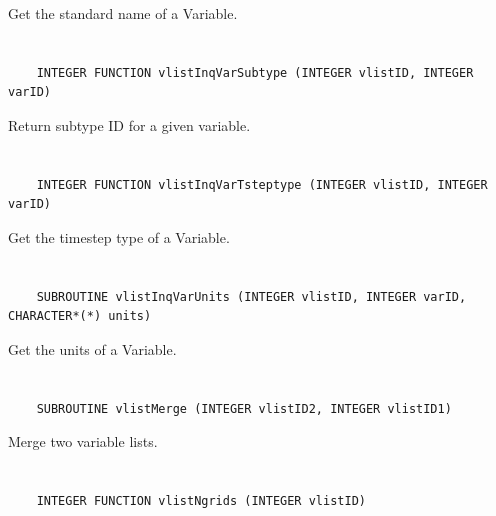 Get the standard name of a Variable.


\section*{\tt {}}

\begin{verbatim}
    INTEGER FUNCTION vlistInqVarSubtype (INTEGER vlistID, INTEGER varID)
\end{verbatim}

Return subtype ID for a given variable.


\section*{\tt {}}

\begin{verbatim}
    INTEGER FUNCTION vlistInqVarTsteptype (INTEGER vlistID, INTEGER varID)
\end{verbatim}

Get the timestep type of a Variable.


\section*{\tt {}}

\begin{verbatim}
    SUBROUTINE vlistInqVarUnits (INTEGER vlistID, INTEGER varID, CHARACTER*(*) units)
\end{verbatim}

Get the units of a Variable.


\section*{\tt {}}

\begin{verbatim}
    SUBROUTINE vlistMerge (INTEGER vlistID2, INTEGER vlistID1)
\end{verbatim}

Merge two variable lists.


\section*{\tt {}}

\begin{verbatim}
    INTEGER FUNCTION vlistNgrids (INTEGER vlistID)
\end{verbatim}

